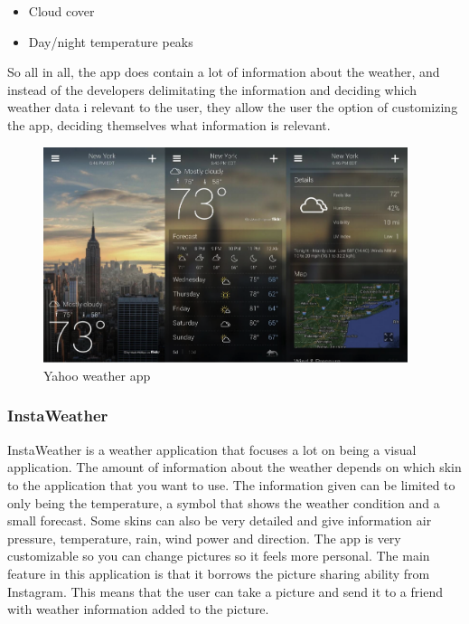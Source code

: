 \begin{itemize}
    \item Cloud cover
    \item Day/night temperature peaks
\end{itemize}

So all in all, the app does contain a lot of information about the weather, and instead of the developers delimitating the information and deciding which weather data i relevant to the user, they allow the user the option of customizing the app, deciding themselves what information is relevant. 

\begin{figure}[!htbp]
    \centering
    \includegraphics[width=0.95\textwidth]{images/Yahoo1.png}
    \caption{Yahoo weather app}
    \label{fig:yahoo1}
\end{figure}


\FloatBarrier
\subsubsection*{InstaWeather} %
\label{ssub:instaweather}

InstaWeather is a weather application that focuses a lot on being a visual application. The amount of information about the weather depends on which skin to the application that you want to use. The information given can be limited to only being the temperature, a symbol that shows the weather condition and a small forecast. Some skins can also be very detailed and give information air pressure, temperature, rain, wind power and direction. The app is very customizable so you can change pictures so it feels more personal. The main feature in this application is that it borrows the picture sharing ability from Instagram. This means that the user can take a picture and send it to a friend with weather information added to the picture. 

